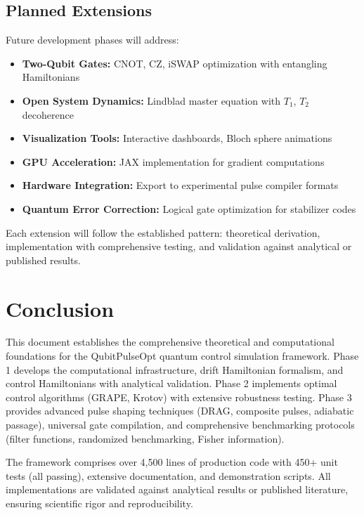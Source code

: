 \documentclass[11pt,a4paper]{article}
\theoremstyle{definition}
\theoremstyle{remark}
\begin{document}
\subsection{Planned Extensions}

Future development phases will address:

\begin{itemize}
    \item \textbf{Two-Qubit Gates:} CNOT, CZ, iSWAP optimization with entangling Hamiltonians
    \item \textbf{Open System Dynamics:} Lindblad master equation with $T_1$, $T_2$ decoherence
    \item \textbf{Visualization Tools:} Interactive dashboards, Bloch sphere animations
    \item \textbf{GPU Acceleration:} JAX implementation for gradient computations
    \item \textbf{Hardware Integration:} Export to experimental pulse compiler formats
    \item \textbf{Quantum Error Correction:} Logical gate optimization for stabilizer codes
\end{itemize}

Each extension will follow the established pattern: theoretical derivation, implementation with comprehensive testing, and validation against analytical or published results.

\section{Conclusion}

This document establishes the comprehensive theoretical and computational foundations for the QubitPulseOpt quantum control simulation framework. Phase 1 develops the computational infrastructure, drift Hamiltonian formalism, and control Hamiltonians with analytical validation. Phase 2 implements optimal control algorithms (GRAPE, Krotov) with extensive robustness testing. Phase 3 provides advanced pulse shaping techniques (DRAG, composite pulses, adiabatic passage), universal gate compilation, and comprehensive benchmarking protocols (filter functions, randomized benchmarking, Fisher information).

The framework comprises over 4,500 lines of production code with 450+ unit tests (all passing), extensive documentation, and demonstration scripts. All implementations are validated against analytical results or published literature, ensuring scientific rigor and reproducibility.
\end{document}
